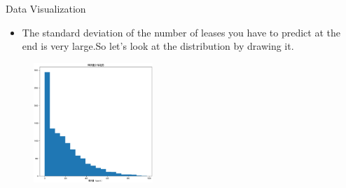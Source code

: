 \documentclass[
 size=14pt,
 paper=smartboard,  %
 mode=present, 		%
 display=slides, 	%
 style=tuliplab,  	%
 pauseslide,
 fleqn,leqno]{powerdot}
\begin{document}
\begin{slide}{Data  Visualization}
  \begin{center}

    {
      \begin{itemize}
      
        \item The standard deviation of the number of leases you have to predict at the end is very large.So let's look at the distribution by drawing it.
      \end{itemize} 
      \begin{figure}
        \centering
        \includegraphics[width=0.4\textwidth]{pic/count .eps}
        
      \end{figure}
    

        
       
    }
    \end{center}
  \bigskip
    \begin{center}
    
    \end{center}
  \bigskip



\end{slide}
\end{document}
